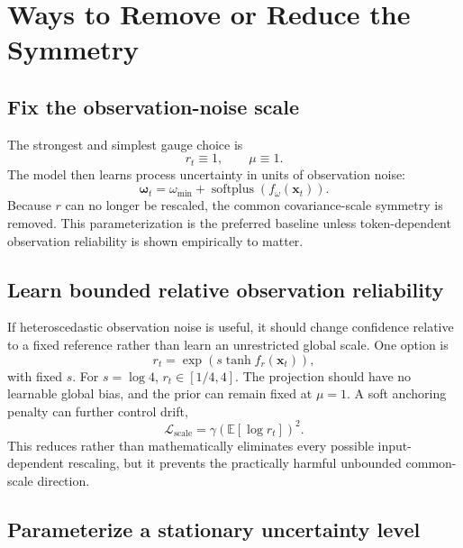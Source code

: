 \documentclass[11pt]{article}
\newcommand{\vct}[1]{\boldsymbol{#1}}
\begin{document}
\section{Ways to Remove or Reduce the Symmetry}

\subsection{Fix the observation-noise scale}

The strongest and simplest gauge choice is
\begin{equation}
  r_t\equiv1, \qquad \mu\equiv1.
\end{equation}
The model then learns process uncertainty in units of observation noise:
\begin{equation}
  \vct{\omega}_t
  = \omega_{\min}+\operatorname{softplus}(f_\omega(\vct{x}_t)).
\end{equation}
Because $r$ can no longer be rescaled, the common covariance-scale symmetry is removed. This
parameterization is the preferred baseline unless token-dependent observation reliability is
shown empirically to matter.

\subsection{Learn bounded relative observation reliability}

If heteroscedastic observation noise is useful, it should change confidence relative to a fixed
reference rather than learn an unrestricted global scale. One option is
\begin{equation}
  r_t=\exp\!\left(s\tanh f_r(\vct{x}_t)\right),
\end{equation}
with fixed $s$. For $s=\log4$, $r_t\in[1/4,4]$. The projection should have no learnable global
bias, and the prior can remain fixed at $\mu=1$. A soft anchoring penalty can further control
drift,
\begin{equation}
  \mathcal{L}_{\mathrm{scale}}
  = \gamma\left(\mathbb{E}[\log r_t]\right)^2.
\end{equation}
This reduces rather than mathematically eliminates every possible input-dependent rescaling,
but it prevents the practically harmful unbounded common-scale direction.

\subsection{Parameterize a stationary uncertainty level}
\end{document}
